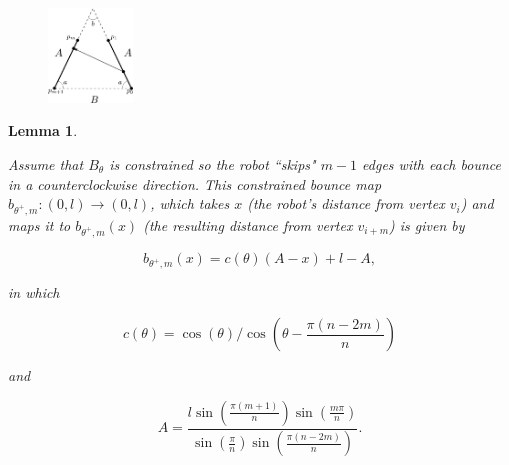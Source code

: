 \documentclass[letterpaper, 10 pt, conference]{ieeeconf}  %
\newtheorem{lemma}{\bf Lemma}
\begin{document}
\begin{figure}[bh]
\centering
\includegraphics[width=0.2\textwidth]{figs/gen_bounce.pdf}
\end{figure}

\begin{lemma} \label{Lemma:3}

Assume that $B_{\theta}$ is constrained so the robot ``skips" $m-1$ edges with
each bounce in a counterclockwise direction. This constrained bounce
map $b_{\theta^+,m} : (0, l) \to (0, l)$, which takes $x$ (the
robot's distance from vertex $v_i$) and maps it to $b_{\theta^+,m}(x)$
(the resulting distance from vertex $v_{i+m}$) is given by

\begin{equation} \label{b-one-bounce}
b_{\theta^+,m}(x) = c(\theta)(A-x) + l - A,
\end{equation}


\noindent in which

\begin{equation} \label{equation:c_theta}
c(\theta) = \cos(\theta)/\cos \left(\theta - \frac{\pi(n-2m)}{n}\right)
\end{equation}

\noindent and

\begin{equation} \label{equation:A}
A = \frac{l \sin(\frac{\pi(m+1)}{n}) \sin( \frac{m \pi}{n} )}{ \sin(
\frac{\pi}{n} ) \sin( \frac{\pi(n-2m)}{n} ) } .
\end{equation}

%
\end{lemma}
\end{document}
